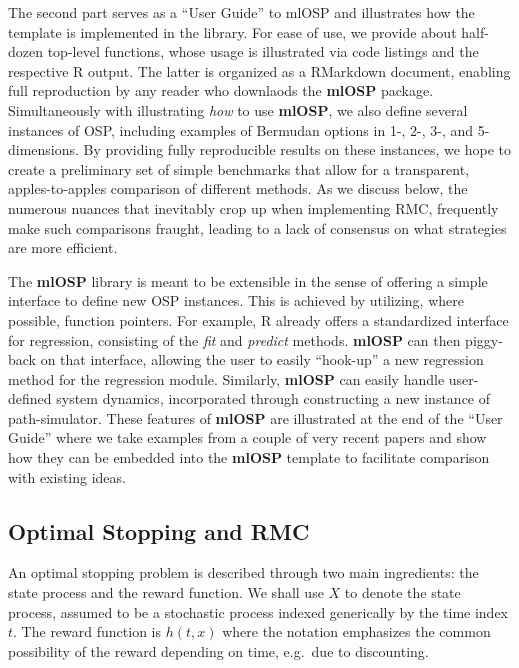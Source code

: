 \documentclass[]{article}
\begin{document}
The second part serves as a ``User Guide'' to mlOSP and illustrates how
the template is implemented in the library. For ease of use, we provide
about half-dozen top-level functions, whose usage is illustrated via
code listings and the respective R output. The latter is organized as a
RMarkdown document, enabling full reproduction by any reader who
downlaods the \textbf{mlOSP} package. Simultaneously with illustrating
\emph{how} to use \textbf{mlOSP}, we also define several instances of
OSP, including examples of Bermudan options in 1-, 2-, 3-, and
5-dimensions. By providing fully reproducible results on these
instances, we hope to create a preliminary set of simple benchmarks that
allow for a transparent, apples-to-apples comparison of different
methods. As we discuss below, the numerous nuances that inevitably crop
up when implementing RMC, frequently make such comparisons fraught,
leading to a lack of consensus on what strategies are more efficient.

The \textbf{mlOSP} library is meant to be extensible in the sense of
offering a simple interface to define new OSP instances. This is
achieved by utilizing, where possible, function pointers. For example, R
already offers a standardized interface for regression, consisting of
the \emph{fit} and \emph{predict} methods. \textbf{mlOSP} can then
piggy-back on that interface, allowing the user to easily ``hook-up'' a
new regression method for the regression module. Similarly,
\textbf{mlOSP} can easily handle user-defined system dynamics,
incorporated through constructing a new instance of path-simulator.
These features of \textbf{mlOSP} are illustrated at the end of the
``User Guide'' where we take examples from a couple of very recent
papers and show how they can be embedded into the \textbf{mlOSP}
template to facilitate comparison with existing ideas.

\subsection{Optimal Stopping and RMC}\label{optimal-stopping-and-rmc}

An optimal stopping problem is described through two main ingredients:
the state process and the reward function. We shall use \(X\) to denote
the state process, assumed to be a stochastic process indexed
generically by the time index \(t\). The reward function is \(h(t,x)\)
where the notation emphasizes the common possibility of the reward
depending on time, e.g.~due to discounting.
\end{document}

